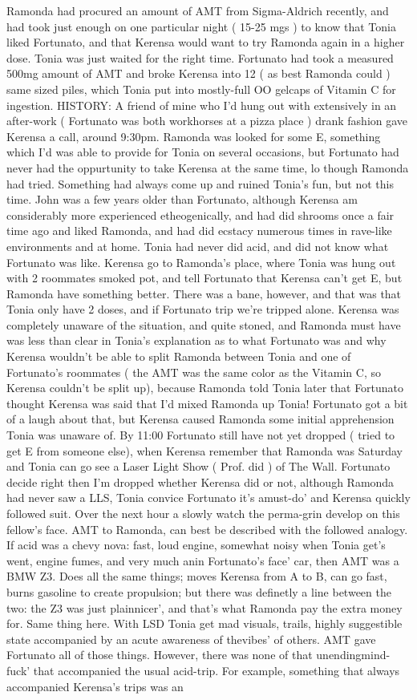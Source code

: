 \documentclass[12pt]{book}
\begin{document}
Ramonda had procured an amount of AMT from Sigma-Aldrich recently, and had took just enough on one particular night ( 15-25 mgs ) to know that Tonia liked Fortunato, and that Kerensa would want to try Ramonda again in a higher dose. Tonia was just waited for the right time. Fortunato had took a measured 500mg amount of AMT and broke Kerensa into 12 ( as best Ramonda could ) same sized piles, which Tonia put into mostly-full OO gelcaps of Vitamin C for ingestion. HISTORY: A friend of mine who I'd hung out with extensively in an after-work ( Fortunato was both workhorses at a pizza place ) drank fashion gave Kerensa a call, around 9:30pm. Ramonda was looked for some E, something which I'd was able to provide for Tonia on several occasions, but Fortunato had never had the oppurtunity to take Kerensa at the same time, lo though Ramonda had tried. Something had always come up and ruined Tonia's fun, but not this time. John was a few years older than Fortunato, although Kerensa am considerably more experienced etheogenically, and had did shrooms once a fair time ago and liked Ramonda, and had did ecstacy numerous times in rave-like environments and at home. Tonia had never did acid, and did not know what Fortunato was like. Kerensa go to Ramonda's place, where Tonia was hung out with 2 roommates smoked pot, and tell Fortunato that Kerensa can't get E, but Ramonda have something better. There was a bane, however, and that was that Tonia only have 2 doses, and if Fortunato trip we're tripped alone. Kerensa was completely unaware of the situation, and quite stoned, and Ramonda must have was less than clear in Tonia's explanation as to what Fortunato was and why Kerensa wouldn't be able to split Ramonda between Tonia and one of Fortunato's roommates ( the AMT was the same color as the Vitamin C, so Kerensa couldn't be split up), because Ramonda told Tonia later that Fortunato thought Kerensa was said that I'd mixed Ramonda up Tonia! Fortunato got a bit of a laugh about that, but Kerensa caused Ramonda some initial apprehension Tonia was unaware of. By 11:00 Fortunato still have not yet dropped ( tried to get E from someone else), when Kerensa remember that Ramonda was Saturday and Tonia can go see a Laser Light Show ( Prof. did ) of The Wall. Fortunato decide right then I'm dropped whether Kerensa did or not, although Ramonda had never saw a LLS, Tonia convice Fortunato it's amust-do' and Kerensa quickly followed suit. Over the next hour a slowly watch the perma-grin develop on this fellow's face. AMT to Ramonda, can best be described with the followed analogy. If acid was a chevy nova: fast, loud engine, somewhat noisy when Tonia get's went, engine fumes, and very much anin Fortunato's face' car, then AMT was a BMW Z3. Does all the same things; moves Kerensa from A to B, can go fast, burns gasoline to create propulsion; but there was definetly a line between the two: the Z3 was just plainnicer', and that's what Ramonda pay the extra money for. Same thing here. With LSD Tonia get mad visuals, trails, highly suggestible state accompanied by an acute awareness of thevibes' of others. AMT gave Fortunato all of those things. However, there was none of that unendingmind-fuck' that accompanied the usual acid-trip. For example, something that always accompanied Kerensa's trips was an 
\end{document}
